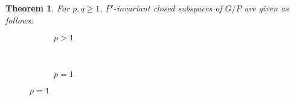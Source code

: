 \documentclass[12pt]{article} %
\newtheorem{theorem}{Theorem}
\theoremstyle{definition}
\theoremstyle{exampstyle} \newtheorem{examp}[theorem]{Theorem}
\begin{document}
\begin{theorem}
For $p, q \geqslant 1$, $P'$-invariant closed subspaces of $G/P$ are given as follows:\\
  \begin{figure}[H]
    \centering
    \begin{subfigure}{0.3\textwidth}
	\caption{$p>1$}
    \end{subfigure}
    ~ %
    \begin{subfigure}{0.3\textwidth}
	\raisebox{40mm}
	{}
	\vspace{0.38cm}
	\caption{$p=1$}
    \end{subfigure}
\end{figure}
\end{theorem}
\end{document}
